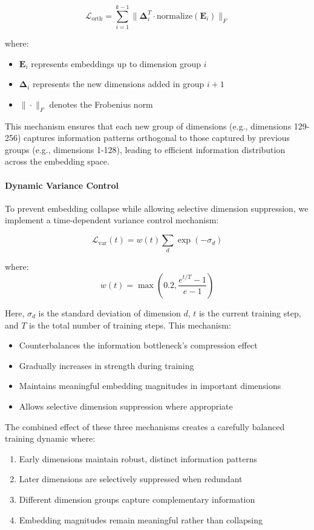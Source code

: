 \begin{equation}
    \mathcal{L}_{\text{orth}} = \sum_{i=1}^{k-1} \|\mathbf{\Delta}_i^T \cdot \text{normalize}(\mathbf{E}_i)\|_F
\end{equation}

where:
\begin{itemize}
    \item $\mathbf{E}_i$ represents embeddings up to dimension group $i$
    \item $\mathbf{\Delta}_i$ represents the new dimensions added in group $i+1$
    \item $\|\cdot\|_F$ denotes the Frobenius norm
\end{itemize}

This mechanism ensures that each new group of dimensions (e.g., dimensions 129-256) captures information patterns orthogonal to those captured by previous groups (e.g., dimensions 1-128), leading to efficient information distribution across the embedding space.

\paragraph{Dynamic Variance Control}
To prevent embedding collapse while allowing selective dimension suppression, we implement a time-dependent variance control mechanism:

\begin{equation}
    \mathcal{L}_{\text{var}}(t) = w(t) \sum_{d} \exp(-\sigma_d)
\end{equation}

where:
\begin{equation}
    w(t) = \max(0.2, \frac{e^{t/T} - 1}{e - 1})
\end{equation}

Here, $\sigma_d$ is the standard deviation of dimension $d$, $t$ is the current training step, and $T$ is the total number of training steps. This mechanism:
\begin{itemize}
    \item Counterbalances the information bottleneck's compression effect
    \item Gradually increases in strength during training
    \item Maintains meaningful embedding magnitudes in important dimensions
    \item Allows selective dimension suppression where appropriate
\end{itemize}

The combined effect of these three mechanisms creates a carefully balanced training dynamic where:
\begin{enumerate}
    \item Early dimensions maintain robust, distinct information patterns
    \item Later dimensions are selectively suppressed when redundant
    \item Different dimension groups capture complementary information
    \item Embedding magnitudes remain meaningful rather than collapsing
\end{enumerate}

